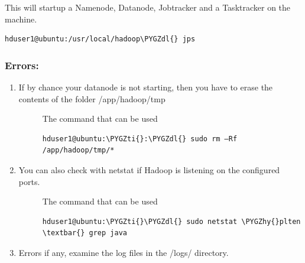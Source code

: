 \documentclass[a4paper,12pt,oneside]{sphinxmanual}
\def\PYGZdl{\char`\$}
\def\PYGZhy{\char`\-}
\def\PYGZti{\char`\~}
\begin{document}
This will startup a Namenode, Datanode, Jobtracker and a Tasktracker on the machine.

\begin{Verbatim}[commandchars=\\\{\}]
hduser1@ubuntu:/usr/local/hadoop\PYGZdl{} jps
\end{Verbatim}
\begin{figure}[htbp]
\centering

\end{figure}


\subsubsection{Errors:}
\label{document:errors}\begin{enumerate}
\item {} \begin{description}
\item[{If by chance your datanode is not starting, then you have to erase the contents of the folder /app/hadoop/tmp}] \leavevmode
The command that can be used

\begin{Verbatim}[commandchars=\\\{\}]
hduser1@ubuntu:\PYGZti{}:\PYGZdl{} sudo rm –Rf /app/hadoop/tmp/*
\end{Verbatim}

\end{description}

\item {} \begin{description}
\item[{You can also check with netstat if Hadoop is listening on the configured ports.}] \leavevmode
The command that can be used

\begin{Verbatim}[commandchars=\\\{\}]
hduser1@ubuntu:\PYGZti{}\PYGZdl{} sudo netstat \PYGZhy{}plten \textbar{} grep java
\end{Verbatim}

\end{description}

\item {} 
Errors if any, examine the log files in the /logs/ directory.

\end{enumerate}
\end{document}
